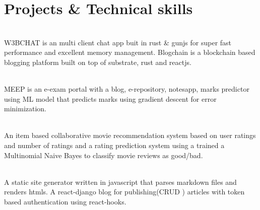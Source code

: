 \documentclass[]{deedy-resume-openfont}
\begin{document}
\section{Projects \& Technical skills}
\raggedright

    \hfill {}\\
    W3BCHAT is an multi client chat app buit in rust \& gunjs for super fast performance and excellent memory management. Blogchain is a blockchain based blogging platform built on top of substrate, rust and reactjs.\\
    \sectionsep

    \hfill {}\\
    MEEP is an e-exam portal with a blog, e-repository, notesapp, marks predictor using ML model that predicts marks using gradient descent for error minimization.\\
    \sectionsep
  

    \hfill {}\\
    An item based collaborative movie recommendation system based on user ratings and number of ratings and a rating prediction system using a trained a Multinomial Naive Bayes to classify movie reviews as good/bad.\\
    \sectionsep
  

    \hfill {}\\
    A static site generator written in javascript that parses markdown files and renders htmls. A react-django blog for publishing(CRUD ) articles with token based authentication using react-hooks. \\
    \sectionsep
  
\end{document}
